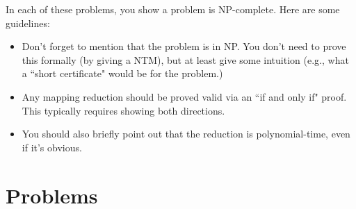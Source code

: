 \documentclass[11pt]{article}
\begin{document}
\assignmentnametitlestuff

In each of these problems, you show a problem is NP-complete. Here are some guidelines:
\begin{itemize}
\item Don't forget to mention that the problem is in NP. You don't need to prove this formally (by giving a NTM), but at least give some intuition (e.g., what a ``short certificate" would be for the problem.)
\item Any mapping reduction should be proved valid via an ``if and only if" proof. This typically requires showing both directions.
\item You should also briefly point out that the reduction is polynomial-time, even if it's obvious.
\end{itemize}
\section*{Problems}
\end{document}
